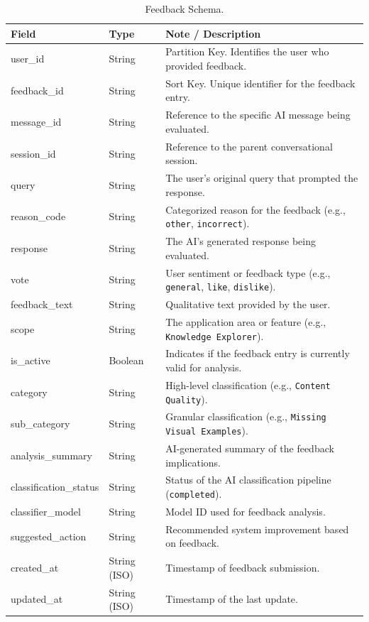\begin{table}[H]
    \centering
    \caption{Feedback Schema.}
    \label{tab:feedback_results}
    \begin{tabular}{llp{9cm}}
        \toprule
        \textbf{Field} & \textbf{Type} & \textbf{Note / Description} \\
        \midrule
        user\_id & String & Partition Key. Identifies the user who provided feedback. \\
        feedback\_id & String & Sort Key. Unique identifier for the feedback entry. \\
        \midrule
        message\_id & String & Reference to the specific AI message being evaluated. \\
        session\_id & String & Reference to the parent conversational session. \\
        query & String & The user's original query that prompted the response. \\
        reason\_code & String & Categorized reason for the feedback (e.g., \texttt{other}, \texttt{incorrect}). \\
        response & String & The AI's generated response being evaluated. \\
        vote & String & User sentiment or feedback type (e.g., \texttt{general}, \texttt{like}, \texttt{dislike}). \\
        feedback\_text & String & Qualitative text provided by the user. \\
        scope & String & The application area or feature (e.g., \texttt{Knowledge Explorer}). \\
        is\_active & Boolean & Indicates if the feedback entry is currently valid for analysis. \\
        category & String & High-level classification (e.g., \texttt{Content Quality}). \\
        sub\_category & String & Granular classification (e.g., \texttt{Missing Visual Examples}). \\
        analysis\_summary & String & AI-generated summary of the feedback implications. \\
        classification\_status & String & Status of the AI classification pipeline (\texttt{completed}). \\
        classifier\_model & String & Model ID used for feedback analysis. \\
        suggested\_action & String & Recommended system improvement based on feedback. \\
        created\_at & String (ISO) & Timestamp of feedback submission. \\
        updated\_at & String (ISO) & Timestamp of the last update. \\
        \bottomrule
    \end{tabular}
\end{table}

